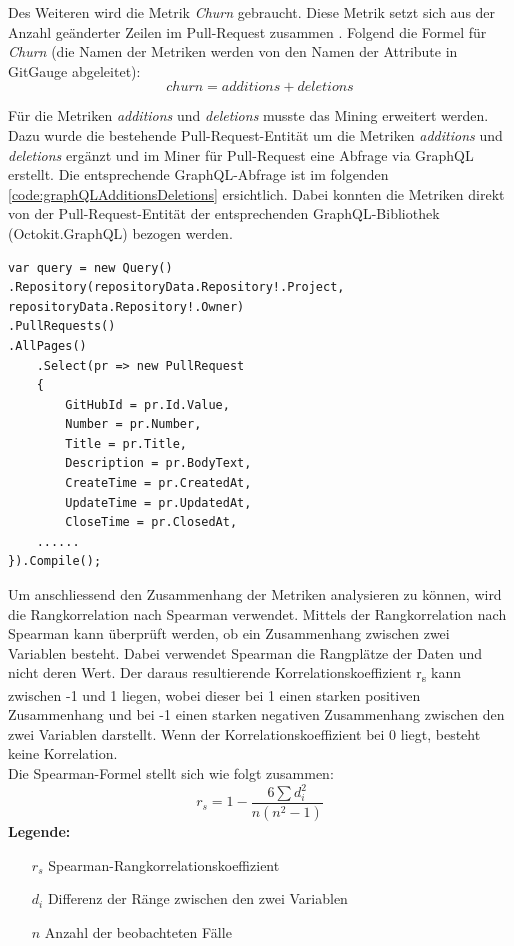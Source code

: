 Des Weiteren wird die Metrik \textit{Churn} gebraucht. Diese Metrik setzt sich aus der Anzahl geänderter Zeilen im Pull-Request zusammen \parencite{gousios_exploratory_2014}. Folgend die Formel für \textit{Churn} (die Namen der Metriken werden von den Namen der Attribute in GitGauge abgeleitet): 
\begin{equation}
churn = additions + deletions
\end{equation}

Für die Metriken \textit{additions} und \textit{deletions} musste das Mining erweitert werden. Dazu wurde die bestehende Pull-Request-Entität um die Metriken \textit{additions} und \textit{deletions} ergänzt und im Miner für Pull-Request eine Abfrage via GraphQL erstellt. Die entsprechende GraphQL-Abfrage ist im folgenden \autoref{code:graphQLAdditionsDeletions} ersichtlich. Dabei konnten die Metriken direkt von der Pull-Request-Entität der entsprechenden GraphQL-Bibliothek (Octokit.GraphQL) bezogen werden.


\begin{lstlisting}[language=CSharp, caption={GraphQL-Abfrage additions und deletions}, label={code:graphQLAdditionsDeletions}]
var query = new Query()
.Repository(repositoryData.Repository!.Project, repositoryData.Repository!.Owner)
.PullRequests()
.AllPages()
    .Select(pr => new PullRequest
    {
        GitHubId = pr.Id.Value,
        Number = pr.Number,
        Title = pr.Title,
        Description = pr.BodyText,
        CreateTime = pr.CreatedAt,
        UpdateTime = pr.UpdatedAt,
        CloseTime = pr.ClosedAt,
    ......
}).Compile();
\end{lstlisting}

Um anschliessend den Zusammenhang der Metriken analysieren zu können, wird die Rangkorrelation nach Spearman verwendet. Mittels der Rangkorrelation nach Spearman \parencite{noauthor_t-test_nodate} kann überprüft werden, ob ein Zusammenhang zwischen zwei Variablen besteht. Dabei verwendet Spearman die Rangplätze der Daten und nicht deren Wert. Der daraus resultierende Korrelationskoeffizient r\textsubscript{s} kann zwischen -1 und 1 liegen, wobei dieser bei 1 einen starken positiven Zusammenhang und bei -1 einen starken negativen Zusammenhang zwischen den zwei Variablen darstellt. Wenn der Korrelationskoeffizient bei 0 liegt, besteht keine Korrelation. \parencite{noauthor_t-test_nodate}  \\
Die Spearman-Formel \parencite{noauthor_t-test_nodate} stellt sich wie folgt zusammen: 
\begin{equation}
r_s = 1 - \frac{6 \sum d_i^2}{n(n^2 - 1)}
\end{equation}
\label{eqn:spearman}
\noindent\textbf{Legende:}
\begin{itemize}
  \item [$r_s$] Spearman-Rangkorrelationskoeffizient
  \item[$d_i$] Differenz der Ränge zwischen den zwei Variablen 
  \item[$n$] Anzahl der beobachteten Fälle
\end{itemize}

